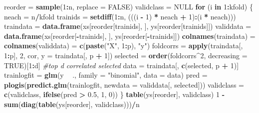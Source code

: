 \documentclass[]{article}
\newenvironment{Shaded}{\begin{snugshade}}{\end{snugshade}}
\newcommand{\CommentTok}[1]{\textcolor[rgb]{0.56,0.35,0.01}{\textit{#1}}}
\newcommand{\ControlFlowTok}[1]{\textcolor[rgb]{0.13,0.29,0.53}{\textbf{#1}}}
\newcommand{\DataTypeTok}[1]{\textcolor[rgb]{0.13,0.29,0.53}{#1}}
\newcommand{\DecValTok}[1]{\textcolor[rgb]{0.00,0.00,0.81}{#1}}
\newcommand{\FloatTok}[1]{\textcolor[rgb]{0.00,0.00,0.81}{#1}}
\newcommand{\KeywordTok}[1]{\textcolor[rgb]{0.13,0.29,0.53}{\textbf{#1}}}
\newcommand{\NormalTok}[1]{#1}
\newcommand{\OperatorTok}[1]{\textcolor[rgb]{0.81,0.36,0.00}{\textbf{#1}}}
\newcommand{\OtherTok}[1]{\textcolor[rgb]{0.56,0.35,0.01}{#1}}
\newcommand{\StringTok}[1]{\textcolor[rgb]{0.31,0.60,0.02}{#1}}
\begin{document}
\begin{Shaded}
\begin{Highlighting}[]
\NormalTok{reorder =}\StringTok{ }\KeywordTok{sample}\NormalTok{(}\DecValTok{1}\OperatorTok{:}\NormalTok{n, }\DataTypeTok{replace =} \OtherTok{FALSE}\NormalTok{)}
\NormalTok{validclass =}\StringTok{ }\OtherTok{NULL}
\ControlFlowTok{for}\NormalTok{ (i }\ControlFlowTok{in} \DecValTok{1}\OperatorTok{:}\NormalTok{kfold) \{}
\NormalTok{    neach =}\StringTok{ }\NormalTok{n}\OperatorTok{/}\NormalTok{kfold}
\NormalTok{    trainids =}\StringTok{ }\KeywordTok{setdiff}\NormalTok{(}\DecValTok{1}\OperatorTok{:}\NormalTok{n, (((i }\OperatorTok{-}\StringTok{ }\DecValTok{1}\NormalTok{) }\OperatorTok{*}\StringTok{ }\NormalTok{neach }\OperatorTok{+}\StringTok{ }\DecValTok{1}\NormalTok{)}\OperatorTok{:}\NormalTok{(i }\OperatorTok{*}\StringTok{ }\NormalTok{neach)))}
\NormalTok{    traindata =}\StringTok{ }\KeywordTok{data.frame}\NormalTok{(xs[reorder[trainids], ], ys[reorder[trainids]])}
\NormalTok{    validdata =}\StringTok{ }\KeywordTok{data.frame}\NormalTok{(xs[reorder[}\OperatorTok{-}\NormalTok{trainids], ], ys[reorder[}\OperatorTok{-}\NormalTok{trainids]])}
    \KeywordTok{colnames}\NormalTok{(traindata) =}\StringTok{ }\KeywordTok{colnames}\NormalTok{(validdata) =}\StringTok{ }\KeywordTok{c}\NormalTok{(}\KeywordTok{paste}\NormalTok{(}\StringTok{"X"}\NormalTok{, }\DecValTok{1}\OperatorTok{:}\NormalTok{p), }\StringTok{"y"}\NormalTok{)}
\NormalTok{    foldcorrs =}\StringTok{ }\KeywordTok{apply}\NormalTok{(traindata[, }\DecValTok{1}\OperatorTok{:}\NormalTok{p], }\DecValTok{2}\NormalTok{, cor, }\DataTypeTok{y =}\NormalTok{ traindata[, p }\OperatorTok{+}\StringTok{ }\DecValTok{1}\NormalTok{])}
\NormalTok{    selected =}\StringTok{ }\KeywordTok{order}\NormalTok{(foldcorrs}\OperatorTok{^}\DecValTok{2}\NormalTok{, }\DataTypeTok{decreasing =} \OtherTok{TRUE}\NormalTok{)[}\DecValTok{1}\OperatorTok{:}\NormalTok{d]  }\CommentTok{#top d correlated selected}
\NormalTok{    data =}\StringTok{ }\NormalTok{traindata[, }\KeywordTok{c}\NormalTok{(selected, p }\OperatorTok{+}\StringTok{ }\DecValTok{1}\NormalTok{)]}
\NormalTok{    trainlogfit =}\StringTok{ }\KeywordTok{glm}\NormalTok{(y }\OperatorTok{~}\StringTok{ }\NormalTok{., }\DataTypeTok{family =} \StringTok{"binomial"}\NormalTok{, }\DataTypeTok{data =}\NormalTok{ data)}
\NormalTok{    pred =}\StringTok{ }\KeywordTok{plogis}\NormalTok{(}\KeywordTok{predict.glm}\NormalTok{(trainlogfit, }\DataTypeTok{newdata =}\NormalTok{ validdata[, selected]))}
\NormalTok{    validclass =}\StringTok{ }\KeywordTok{c}\NormalTok{(validclass, }\KeywordTok{ifelse}\NormalTok{(pred }\OperatorTok{>}\StringTok{ }\FloatTok{0.5}\NormalTok{, }\DecValTok{1}\NormalTok{, }\DecValTok{0}\NormalTok{))}
\NormalTok{\}}
\KeywordTok{table}\NormalTok{(ys[reorder], validclass)}
\DecValTok{1} \OperatorTok{-}\StringTok{ }\KeywordTok{sum}\NormalTok{(}\KeywordTok{diag}\NormalTok{(}\KeywordTok{table}\NormalTok{(ys[reorder], validclass)))}\OperatorTok{/}\NormalTok{n}
\end{Highlighting}
\end{Shaded}
\end{document}
